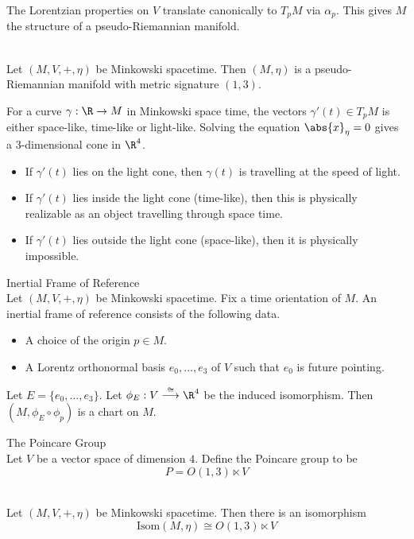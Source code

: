 \documentclass[a4paper]{article}
\begin{document}
The Lorentzian properties on $V$ translate canonically to $T_pM$ via $\alpha_p$. This gives $M$ the structure of a pseudo-Riemannian manifold. 

\begin{prp}{}{}\\
Let $(M,V,+,\eta)$ be Minkowski spacetime. Then $(M,\eta)$ is a pseudo-Riemannian manifold with metric signature $(1,3)$. 
\end{prp}

For a curve $\gamma:\R\to M$ in Minkowski space time, the vectors $\gamma'(t)\in T_pM$ is either space-like, time-like or light-like. Solving the equation $\abs{x}_\eta=0$ gives a $3$-dimensional cone in $\R^4$. 
\begin{itemize}
\item If $\gamma'(t)$ lies on the light cone, then $\gamma(t)$ is travelling at the speed of light. 
\item If $\gamma'(t)$ lies inside the light cone (time-like), then this is physically realizable as an object travelling through space time. 
\item If $\gamma'(t)$ lies outside the light cone (space-like), then it is physically impossible. 
\end{itemize}

\begin{defn}{Inertial Frame of Reference}{}\\
Let $(M,V,+,\eta)$ be Minkowski spacetime. Fix a time orientation of $M$. An inertial frame of reference consists of the following data. 
\begin{itemize}
\item A choice of the origin $p\in M$. 
\item A Lorentz orthonormal basis $e_0,\dots,e_3$ of $V$ such that $e_0$ is future pointing. 
\end{itemize}
\end{defn}

Let $E=\{e_0,\dots,e_3\}$. Let $\phi_E:V\overset{\cong}{\longrightarrow}\R^4$ be the induced isomorphism. Then $(M,\phi_E\circ\phi_p)$ is a chart on $M$. 

\begin{defn}{The Poincare Group}{}\\
Let $V$ be a vector space of dimension $4$. Define the Poincare group to be $$P=O(1,3)\ltimes V$$
\end{defn}

\begin{prp}{}{}\\
Let $(M,V,+,\eta)$ be Minkowski spacetime. Then there is an isomorphism $$\text{Isom}(M,\eta)\cong O(1,3)\ltimes V$$
\end{prp}
\end{document}
